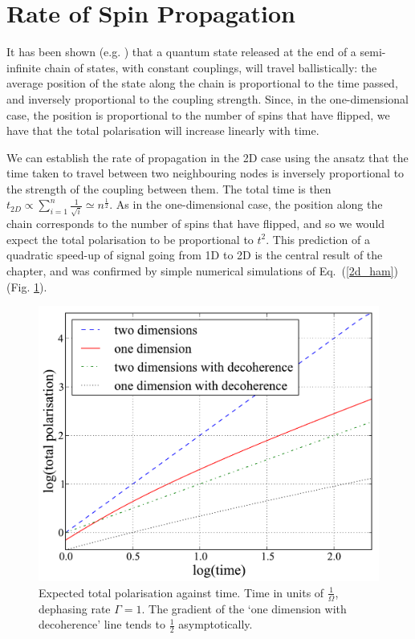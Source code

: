 \section{Rate of Spin Propagation}

It has been shown (e.g. \cite{Fitzsimons:2005p6472}) that a quantum state released at the end of a semi-infinite chain of states, with constant couplings, will travel ballistically: the average position of the state along the chain is proportional to the time passed, and inversely proportional to the coupling strength. Since, in the one-dimensional case, the position is proportional to the number of spins that have flipped, we have that the total polarisation will increase linearly with time.

We can establish the rate of propagation in the 2D case using the ansatz that the time taken to travel between two neighbouring nodes is inversely proportional to the strength of the coupling between them. The total time is then $t_{2D}\propto \sum_{i=1}^{n}\frac{1}{\sqrt{i}}\simeq n^{\frac{1}{2}}$. As in the one-dimensional case, the position along the chain corresponds to the  number of spins that have flipped, and so we would expect the total polarisation to be proportional to $t^2$. This prediction of a quadratic speed-up of signal going from 1D to 2D is the central result of the chapter, and was confirmed by simple numerical simulations of Eq.~(\ref{2d_ham}) (Fig. \ref{comparison}).

\begin{figure}
  \begin{center}
    \includegraphics[scale=0.7]{assets/comparison.pdf}
  \end{center}
  \caption{Expected total polarisation against time. Time in units of $\frac{1}{\Omega}$, dephasing rate $\Gamma = 1$. The gradient of the `one dimension with decoherence' line tends to $\frac{1}{2}$ asymptotically.}
  \label{comparison}
\end{figure}

